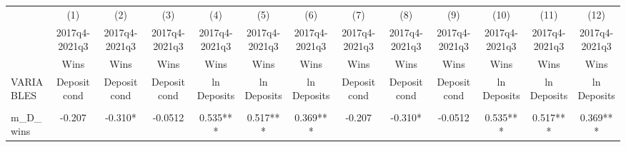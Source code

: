 \documentclass[]{article}
\begin{document}
\begin{center}
\begin{tabular}{lcccccccccccc} \hline
 & (1) & (2) & (3) & (4) & (5) & (6) & (7) & (8) & (9) & (10) & (11) & (12) \\
 & 2017q4-2021q3 & 2017q4-2021q3 & 2017q4-2021q3 & 2017q4-2021q3 & 2017q4-2021q3 & 2017q4-2021q3 & 2017q4-2021q3 & 2017q4-2021q3 & 2017q4-2021q3 & 2017q4-2021q3 & 2017q4-2021q3 & 2017q4-2021q3 \\
 & Wins & Wins & Wins & Wins & Wins & Wins & Wins & Wins & Wins & Wins & Wins & Wins \\
VARIABLES & Deposit cond & Deposit cond & Deposit cond & ln Deposits & ln Deposits & ln Deposits & Deposit cond & Deposit cond & Deposit cond & ln Deposits & ln Deposits & ln Deposits \\ \hline
\vspace{4pt} & \begin{footnotesize}\end{footnotesize} & \begin{footnotesize}\end{footnotesize} & \begin{footnotesize}\end{footnotesize} & \begin{footnotesize}\end{footnotesize} & \begin{footnotesize}\end{footnotesize} & \begin{footnotesize}\end{footnotesize} & \begin{footnotesize}\end{footnotesize} & \begin{footnotesize}\end{footnotesize} & \begin{footnotesize}\end{footnotesize} & \begin{footnotesize}\end{footnotesize} & \begin{footnotesize}\end{footnotesize} & \begin{footnotesize}\end{footnotesize} \\
m\_D\_wins & -0.207 & -0.310* & -0.0512 & 0.535*** & 0.517*** & 0.369*** & -0.207 & -0.310* & -0.0512 & 0.535*** & 0.517*** & 0.369*** \\

\end{tabular}
\end{center}
\end{document}
